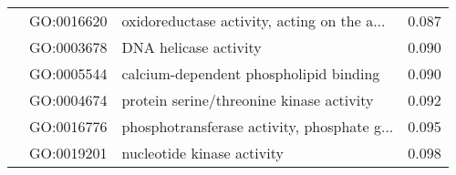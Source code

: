 \begin{longtable}{lllr}
   & GO:0016620 &  oxidoreductase activity, acting on the a... &         0.087 \\
   & GO:0003678 &                        DNA helicase activity &         0.090 \\
   & GO:0005544 &       calcium-dependent phospholipid binding &         0.090 \\
   & GO:0004674 &     protein serine/threonine kinase activity &         0.092 \\
   & GO:0016776 &  phosphotransferase activity, phosphate g... &         0.095 \\
   & GO:0019201 &                   nucleotide kinase activity &         0.098 \\
\end{longtable}
